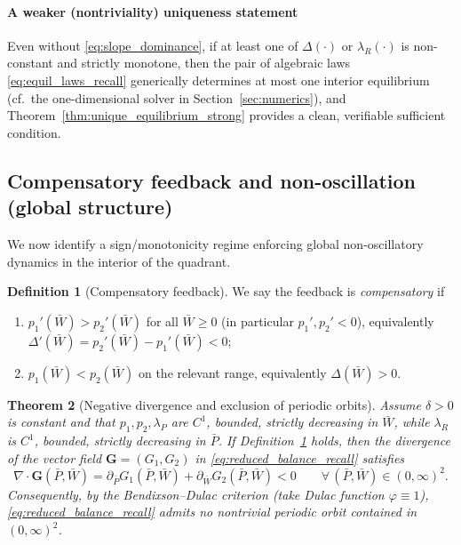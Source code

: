 \documentclass[pdflatex,sn-mathphys-ay]{sn-jnl}
\theoremstyle{thmstyleone}
\newtheorem{theorem}{Theorem}[section]
\theoremstyle{definition}
\newtheorem{definition}[theorem]{Definition}
\theoremstyle{remark}
\begin{document}
\paragraph{A weaker (nontriviality) uniqueness statement}
Even without \eqref{eq:slope_dominance}, if at least one of $\Delta(\cdot)$ or $\lambda_R(\cdot)$ is
non-constant and strictly monotone, then the pair of algebraic laws \eqref{eq:equil_laws_recall}
generically determines at most one interior equilibrium (cf.\ the one-dimensional solver in
Section~\ref{sec:numerics}), and Theorem~\ref{thm:unique_equilibrium_strong} provides a clean,
verifiable sufficient condition.

\subsection{Compensatory feedback and non-oscillation (global structure)}
\label{subsec:comp_feedback_global}
We now identify a sign/monotonicity regime enforcing global non-oscillatory dynamics in the
interior of the quadrant.

\begin{definition}[Compensatory feedback]\label{def:comp_feedback}
We say the feedback is \emph{compensatory} if
\begin{enumerate}[label=(\roman*), leftmargin=2.2em]
\item $p_1'(\bar W)>p_2'(\bar W)$ for all $\bar W\ge 0$ (in particular $p_1',p_2'<0$),
equivalently $\Delta'(\bar W)=p_2'(\bar W)-p_1'(\bar W)<0$;
\item $p_1(\bar W)<p_2(\bar W)$ on the relevant range, equivalently $\Delta(\bar W)>0$.
\end{enumerate}
\end{definition}

\begin{theorem}[Negative divergence and exclusion of periodic orbits]
\label{thm:no_cycles}
Assume $\delta>0$ is constant and that $p_1,p_2,\lambda_P$ are $C^1$, bounded, strictly decreasing
in $\bar W$, while $\lambda_R$ is $C^1$, bounded, strictly decreasing in $\bar P$.
If Definition~\ref{def:comp_feedback} holds, then the divergence of the vector field
$\mathbf G=(G_1,G_2)$ in \eqref{eq:reduced_balance_recall} satisfies
\begin{equation}\label{eq:neg_div}
\nabla\!\cdot\!\mathbf G(\bar P,\bar W)
=\partial_{\bar P}G_1(\bar P,\bar W)+\partial_{\bar W}G_2(\bar P,\bar W)<0
\qquad\forall\,(\bar P,\bar W)\in(0,\infty)^2.
\end{equation}
Consequently, by the Bendixson--Dulac criterion (take Dulac function $\varphi\equiv 1$),
\eqref{eq:reduced_balance_recall} admits no nontrivial periodic orbit contained in $(0,\infty)^2$.
\end{theorem}
\end{document}
